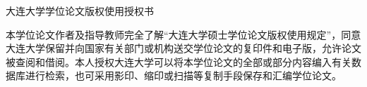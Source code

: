 \cleardoublepage %
\vspace*{0.25cm}
\begin{center}
    { 大连大学学位论文版权使用授权书}

\end{center}

本学位论文作者及指导教师完全了解“大连大学硕士学位论文版权使用规定”，同意大连大学保留并向国家有关部门或机构送交学位论文的复印件和电子版，允许论文被查阅和借阅。本人授权大连大学可以将本学位论文的全部或部分内容编入有关数据库进行检索，也可采用影印、缩印或扫描等复制手段保存和汇编学位论文。